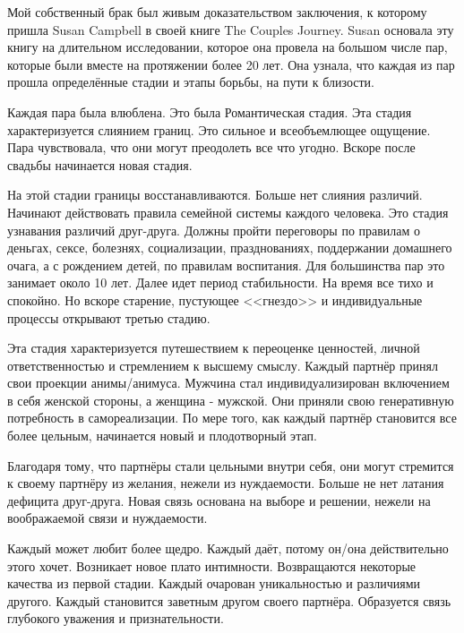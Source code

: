 \documentclass[10pt, fleqn]{article}
\begin{document}
Мой собственный брак был живым доказательством заключения, к которому пришла Susan Campbell в своей книге The Couples Journey. Susan основала эту книгу на длительном исследовании, которое она провела на большом числе пар, которые были вместе на протяжении более 20 лет. Она узнала, что каждая из пар прошла определённые стадии и этапы борьбы, на пути к близости.


Каждая пара была влюблена. Это была Романтическая стадия. Эта стадия характеризуется слиянием границ. Это сильное и всеобъемлющее ощущение. Пара чувствовала, что они могут преодолеть все что угодно. Вскоре после свадьбы начинается новая стадия.



На этой стадии границы восстанавливаются. Больше нет слияния различий. Начинают действовать правила семейной системы каждого человека. Это стадия узнавания различий друг-друга. Должны пройти переговоры по правилам о деньгах, сексе, болезнях, социализации, празднованиях, поддержании домашнего очага, а с рождением детей, по правилам воспитания. Для большинства пар это занимает около 10 лет. Далее идет период стабильности. На время все тихо и спокойно. Но вскоре старение, пустующее <<гнездо>> и индивидуальные процессы открывают третью стадию.



Эта стадия характеризуется путешествием к переоценке ценностей, личной ответственностью и стремлением к высшему смыслу. Каждый партнёр принял свои проекции анимы/анимуса. Мужчина стал индивидуализирован включением в себя женской стороны, а женщина - мужской. Они приняли свою генеративную потребность в самореализации. По мере того, как каждый партнёр становится все более цельным, начинается новый и плодотворный этап.



Благодаря тому, что партнёры стали цельными внутри себя, они могут стремится к своему партнёру из желания, нежели из нуждаемости. Больше не нет латания дефицита друг-друга. Новая связь основана на выборе и решении, нежели на воображаемой связи и нуждаемости.

Каждый может любит более щедро. Каждый даёт, потому он/она действительно этого хочет. Возникает новое плато интимности. Возвращаются некоторые качества из первой стадии. Каждый очарован уникальностью и различиями другого. Каждый становится заветным другом своего партнёра. Образуется связь глубокого уважения и признательности.
\end{document}
